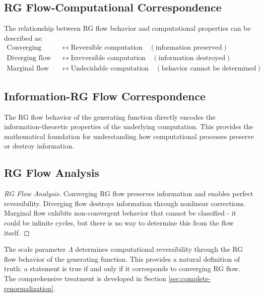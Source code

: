 \subsection{RG Flow-Computational Correspondence}

\begin{conjecture}
\label{conj:rg-computational-correspondence}
The relationship between RG flow behavior and computational properties can be described as:
\begin{align}
\text{Converging flow} &\leftrightarrow \text{Reversible computation} \quad (\text{information preserved}) \\
\text{Diverging flow} &\leftrightarrow \text{Irreversible computation} \quad (\text{information destroyed}) \\
\text{Marginal flow} &\leftrightarrow \text{Undecidable computation} \quad (\text{behavior cannot be determined})
\end{align}
\end{conjecture}

\subsection{Information-RG Flow Correspondence}

The RG flow behavior of the generating function directly encodes the information-theoretic properties of the underlying computation. This provides the mathematical foundation for understanding how computational processes preserve or destroy information.

\subsection{RG Flow Analysis}

\begin{proof}[RG Flow Analysis]
Converging RG flow preserves information and enables perfect reversibility. Diverging flow destroys information through nonlinear corrections. Marginal flow exhibits non-convergent behavior that cannot be classified - it could be infinite cycles, but there is no way to determine this from the flow itself.
\end{proof}

The scale parameter $\Lambda$ determines computational reversibility through the RG flow behavior of the generating function. This provides a natural definition of truth: a statement is true if and only if it corresponds to converging RG flow. The comprehensive treatment is developed in Section \ref{sec:complete-renormalization}.

